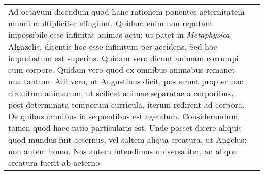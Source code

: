 \documentclass[10pt]{jsarticle} %
\begin{document}
\begin{longtable}{p{21em}p{21em}}
\\


Ad octavum dicendum quod hanc rationem ponentes aeternitatem mundi
 multipliciter effugiunt. Quidam enim non reputant impossibile esse
 infinitas animas actu; ut patet in {\it Metaphysica} Algazelis, dicentis hoc
 esse infinitum per accidens. Sed hoc improbatum est superius. Quidam
 vero dicunt animam corrumpi cum corpore. Quidam vero quod ex omnibus
 animabus remanet una tantum. Alii vero, ut Augustinus dicit, posuerunt
 propter hoc circuitum animarum; ut scilicet animae separatae a
 corporibus, post determinata temporum curricula, iterum redirent ad
 corpora. De quibus omnibus in sequentibus est agendum. Considerandum
 tamen quod haec ratio particularis est. Unde posset dicere aliquis quod
 mundus fuit aeternus, vel saltem aliqua creatura, ut Angelus; non autem
 homo. Nos autem intendimus universaliter, an aliqua creatura fuerit ab
 aeterno.

&


\end{longtable}
\end{document}
